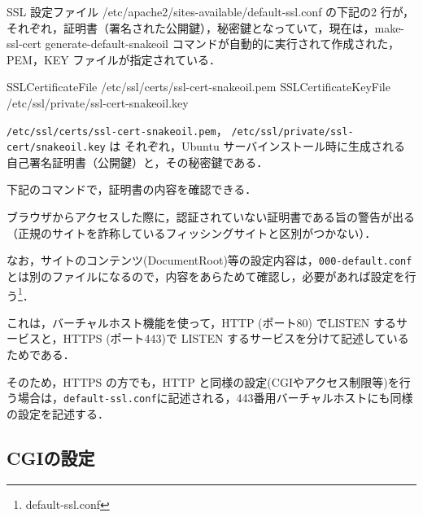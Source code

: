 SSL 設定ファイル /etc/apache2/sites-available/default-ssl.conf の下記の2 行が，それぞれ，証明書（署名された公開鍵），秘密鍵となっていて，現在は，make-ssl-cert generate-default-snakeoil コマンドが自動的に実行されて作成された，PEM，KEY ファイルが指定されている．

\begin{cli}
 SSLCertificateFile /etc/ssl/certs/ssl-cert-snakeoil.pem
 SSLCertificateKeyFile /etc/ssl/private/ssl-cert-snakeoil.key
\end{cli}

\texttt{/etc/ssl/certs/ssl-cert-snakeoil.pem}，
\texttt{/etc/ssl/private/ssl-cert/snakeoil.key} は
それぞれ，Ubuntu サーバインストール時に生成される
自己署名証明書（公開鍵）と，その秘密鍵である．

下記のコマンドで，証明書の内容を確認できる．


ブラウザからアクセスした際に，認証されていない証明書である旨の警告が出る
（正規のサイトを詐称しているフィッシングサイトと区別がつかない）．

なお，サイトのコンテンツ(DocumentRoot)等の設定内容は，\texttt{000-default.conf}とは別のファイルになるので，内容をあらためて確認し，必要があれば設定を行う\footnote{default-ssl.conf}．

これは，バーチャルホスト機能を使って，HTTP (ポート80) でLISTEN するサービスと，HTTPS (ポート443)で LISTEN するサービスを分けて記述しているためである．

そのため，HTTPS の方でも，HTTP と同様の設定(CGIやアクセス制限等)を行う場合は，\texttt{default-ssl.conf}に記述される，443番用バーチャルホストにも同様の設定を記述する．

\subsection{CGIの設定}

